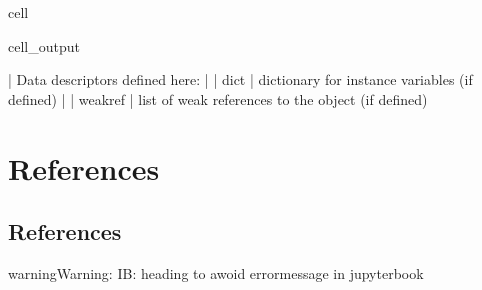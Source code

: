 \documentclass[letterpaper,10pt,english]{jupyterBook}
\begin{document}
\begin{sphinxuseclass}{cell}
\begin{sphinxVerbatimOutput}
\begin{sphinxuseclass}{cell_output}
\begin{sphinxVerbatim}[commandchars=\\\{\}]
 |  Data descriptors defined here:
 |  
 |  \PYGZus{}\PYGZus{}dict\PYGZus{}\PYGZus{}
 |      dictionary for instance variables (if defined)
 |  
 |  \PYGZus{}\PYGZus{}weakref\PYGZus{}\PYGZus{}
 |      list of weak references to the object (if defined)
\end{sphinxVerbatim}

\end{sphinxuseclass}\end{sphinxVerbatimOutput}

\end{sphinxuseclass}
\sphinxstepscope


\part{References}

\sphinxstepscope


\chapter{References}
\label{\detokenize{content/99_BackMatter/References:references}}\label{\detokenize{content/99_BackMatter/References::doc}}
\begin{sphinxadmonition}{warning}{Warning:}
\sphinxAtStartPar
IB: heading to awoid errormessage in jupyterbook
\end{sphinxadmonition}
\end{document}

